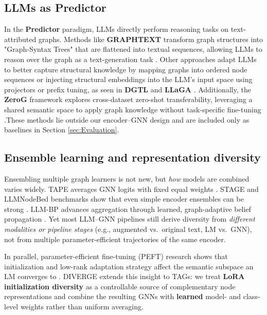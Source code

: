 \documentclass[a4paper,fleqn]{cas-sc}
\begin{document}
\subsection{LLMs as Predictor}
In the \textbf{Predictor} paradigm, LLMs directly perform reasoning tasks on text-attributed graphs. Methods like \textbf{GRAPHTEXT} transform graph structures into "Graph-Syntax Trees" that are flattened into textual sequences, allowing LLMs to reason over the graph as a text-generation task \citep{Zhao2024GraphText}. Other approaches adapt LLMs to better capture structural knowledge by mapping graphs into ordered node sequences or injecting structural embeddings into the LLM's input space using projectors or prefix tuning, as seen in \textbf{DGTL} \citep{Qin2024DisentangledTAG} and \textbf{LLaGA} \citet{Chen2024LLaGA}. Additionally, the \textbf{ZeroG} framework explores cross-dataset zero-shot transferability, leveraging a shared semantic space to apply graph knowledge without task-specific fine-tuning \citep{Li2024ZeroG}.These methods lie outside our encoder–GNN
design and are included only as baselines in Section \ref{sec:Evaluation}.

\subsection{Ensemble learning and representation diversity}

Ensembling multiple graph learners is not new, but \emph{how} models are combined varies widely. TAPE averages GNN logits with fixed equal weights \citep{he2024harnessing}. STAGE and LLMNodeBed benchmarks show that even simple encoder ensembles can be strong \citep{zolnai-lucas-etal-2024-stage, Wu2025LLMNode}. LLM-BP advances aggregation through learned, graph-adaptive belief propagation \citep{wang2025llmbp}. Yet most LLM--GNN pipelines still derive diversity from \emph{different modalities or pipeline stages} (e.g., augmented vs.\ original text, LM vs.\ GNN), not from multiple parameter-efficient trajectories of the same encoder.

In parallel, parameter-efficient fine-tuning (PEFT) research shows that initialization and low-rank adaptation strategy affect the semantic subspace an LM converges to \citep{Hu2021LoRA, meng2024pissa, paischer2024eva, li2023loftq, zhang2025orthogonal, wang2025peft}. DIVERGE extends this insight to TAGs: we treat \textbf{LoRA initialization diversity} as a controllable source of complementary node representations and combine the resulting GNNs with \textbf{learned} model- and class-level weights rather than uniform averaging.
\end{document}
